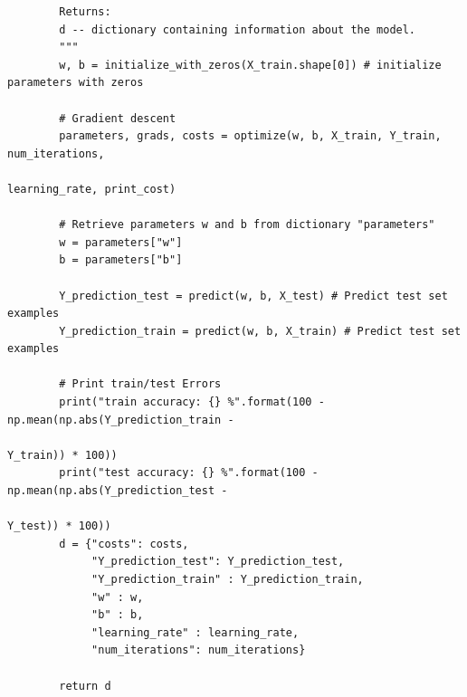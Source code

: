 \documentclass[11pt, a4paper]{article}
\begin{document}
\begin{spacing}{1.1}
\begin{lstlisting}
		Returns:
		d -- dictionary containing information about the model.
		"""
		w, b = initialize_with_zeros(X_train.shape[0]) # initialize parameters with zeros 
		
		# Gradient descent
		parameters, grads, costs = optimize(w, b, X_train, Y_train, num_iterations, 
										                    learning_rate, print_cost)
		
		# Retrieve parameters w and b from dictionary "parameters"
		w = parameters["w"]
		b = parameters["b"]
		
		Y_prediction_test = predict(w, b, X_test) # Predict test set examples
		Y_prediction_train = predict(w, b, X_train) # Predict test set examples

		# Print train/test Errors
		print("train accuracy: {} %".format(100 - np.mean(np.abs(Y_prediction_train - 
		                                                         Y_train)) * 100))
		print("test accuracy: {} %".format(100 - np.mean(np.abs(Y_prediction_test - 
		                                                        Y_test)) * 100))
		d = {"costs": costs,
		     "Y_prediction_test": Y_prediction_test, 
		     "Y_prediction_train" : Y_prediction_train, 
		     "w" : w, 
		     "b" : b,
		     "learning_rate" : learning_rate,
		     "num_iterations": num_iterations}
		
		return d 
		

\end{lstlisting}
\end{spacing}
\end{document}

